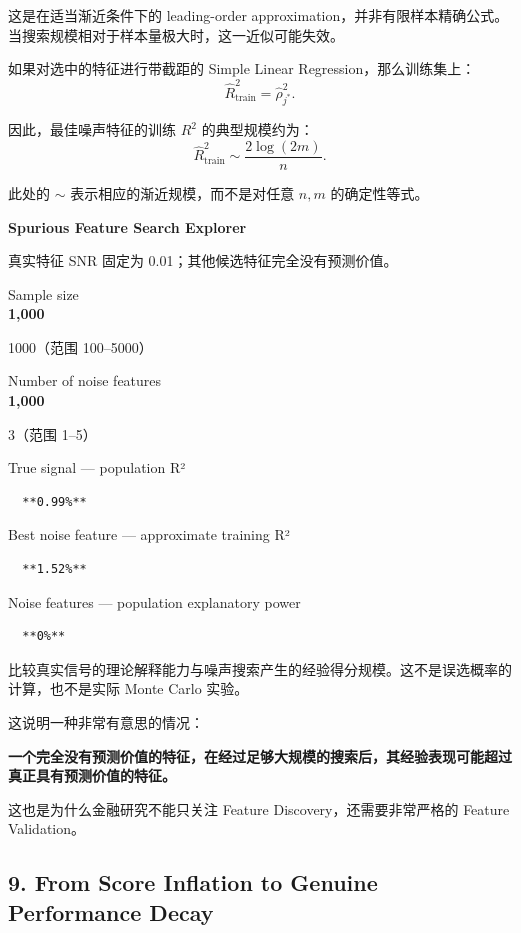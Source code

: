 这是在适当渐近条件下的 leading-order approximation，并非有限样本精确公式。当搜索规模相对于样本量极大时，这一近似可能失效。

如果对选中的特征进行带截距的 Simple Linear Regression，那么训练集上：
\[\widehat R^2_{\mathrm{train}}
=
\hat\rho_{j^*}^2.\]

因此，最佳噪声特征的训练 \(R^2\) 的典型规模约为：
\[\boxed{
\widehat R^2_{\mathrm{train}}
\sim
\frac{2\log(2m)}{n}.
}\]

此处的 \(\sim\) 表示相应的渐近规模，而不是对任意 \(n,m\) 的确定性等式。

\textbf{Spurious Feature Search Explorer}

真实特征 SNR 固定为 0.01；其他候选特征完全没有预测价值。

Sample size\\
\textbf{1,000}

1000（范围 100--5000）

Number of noise features\\
\textbf{1,000}

3（范围 1--5）

True signal --- population R²

\begin{verbatim}
  **0.99%**
\end{verbatim}

Best noise feature --- approximate training R²

\begin{verbatim}
  **1.52%**
\end{verbatim}

Noise features --- population explanatory power

\begin{verbatim}
  **0%**
\end{verbatim}

比较真实信号的理论解释能力与噪声搜索产生的经验得分规模。这不是误选概率的计算，也不是实际 Monte Carlo 实验。

这说明一种非常有意思的情况：

\textbf{一个完全没有预测价值的特征，在经过足够大规模的搜索后，其经验表现可能超过真正具有预测价值的特征。}

这也是为什么金融研究不能只关注 Feature Discovery，还需要非常严格的 Feature Validation。

\hypertarget{part-4-60-0001-from-score-inflation-to-genuine-performance-decay}{%
\subsection{9. From Score Inflation to Genuine Performance Decay}\label{part-4-60-0001-from-score-inflation-to-genuine-performance-decay}}

